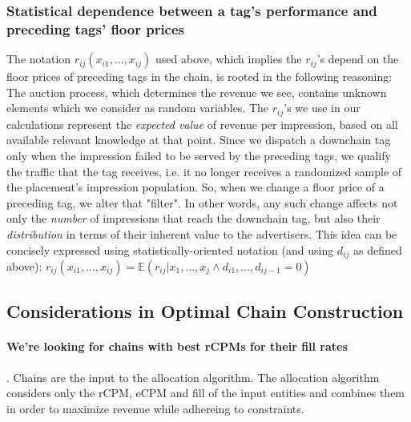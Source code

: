 \documentclass{article}
\begin{document}
\begin{large}
\subsubsection{Statistical dependence between a tag's performance and preceding tags' floor prices}
The notation $r_{ij}(x_{i1},\dots, x_{ij})$ used above, which implies the $r_{ij}$'s depend on the floor prices of preceding tags in the chain, is rooted in the following reasoning: The auction process, which determines the revenue we see, contains unknown elements which we consider as random variables. The $r_{ij}$'s we use in our calculations represent the \emph{expected value} of revenue per impression, based on all available relevant knowledge at that point. Since we dispatch a downchain tag only when the impression failed to be served by the preceding tags, we qualify the traffic that the tag receives, i.e. it no longer receives a randomized sample of the placement's impression population. So, when we change a floor price of a preceding tag, we alter that "filter". In other words, any such change affects not only the \emph{number} of impressions that reach the downchain tag, but also their \emph{distribution} in terms of their inherent value to the advertisers. This idea can be concisely expressed using  statistically-oriented notation (and using $d_{ij}$ as defined above):
$r_{ij}(x_{i1},\dots, x_{ij}) =
\mathbb{E} (r_{ij}|x_1,\dots, x_j \wedge d_{i1}, \dots, d_{ij-1}=0)$

\subsection{Considerations in Optimal Chain Construction}
\paragraph{We're looking for chains with best rCPMs for their fill rates}. Chains are the input to the allocation algorithm. The allocation algorithm considers only the rCPM, eCPM and fill of the input entities and combines them in order to maximize revenue while adhereing to constraints. 



\end{large}
\end{document}
